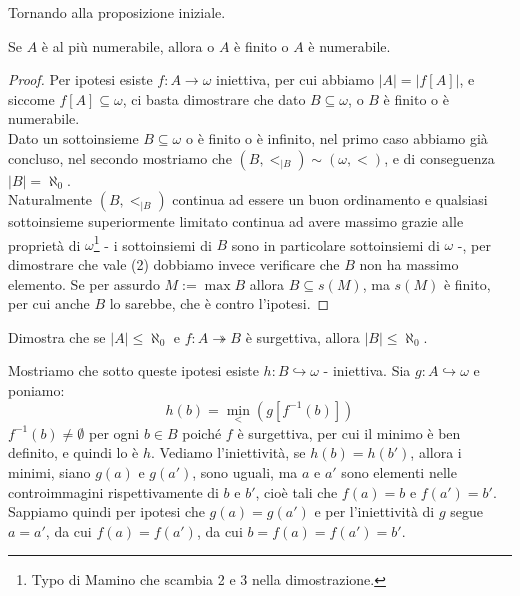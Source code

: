 Tornando alla proposizione iniziale.

\begin{proposition}
	Se $A$ è al più numerabile, allora o $A$ è finito o $A$ è numerabile.
\end{proposition}

\begin{proof}
	Per ipotesi esiste $f : A \rightarrow \omega$ iniettiva, per cui abbiamo $|A| = |f[A]|$, e siccome $f[A] \subseteq \omega$,
	ci basta dimostrare che dato $B \subseteq \omega$, o $B$ è finito o è numerabile.\\
	Dato un sottoinsieme $B \subseteq \omega$ o è finito o è infinito, nel primo caso abbiamo già concluso, nel secondo mostriamo che $(B,<_{|B}) \sim (\omega,<)$, e di conseguenza $|B| = \aleph_0$.\\
	Naturalmente $(B,<_{|B})$ continua ad essere un buon ordinamento e qualsiasi sottoinsieme superiormente limitato continua ad avere massimo grazie alle proprietà di $\omega$\footnote{Typo di Mamino che scambia 2 e 3 nella dimostrazione.} - i sottoinsiemi di $B$ sono in particolare sottoinsiemi di $\omega$ -,
	per dimostrare che vale (2) dobbiamo invece verificare che $B$ non ha massimo elemento. Se per assurdo $M:=\max B$ allora $B \subseteq s(M)$, ma $s(M)$ è finito, per cui anche $B$ lo sarebbe, che è contro l'ipotesi.
\end{proof}

\begin{exercise}
	\label{disuguaglianze_senza_AC2}
	Dimostra che se $|A| \leq \aleph_0$ e $f : A \twoheadrightarrow B$ è surgettiva, allora $|B| \leq \aleph_0$.
\end{exercise}

\begin{soln}
	Mostriamo che sotto queste ipotesi esiste $h : B \hookrightarrow \omega$ - iniettiva. Sia $g : A \hookrightarrow \omega$ e poniamo:
	\[ h(b) = \min_<(g[f^{-1}(b)])
		\]
	$f^{-1}(b) \ne \emptyset$ per ogni $b \in B$ poiché $f$ è surgettiva, per cui il minimo è ben definito, e quindi lo è $h$.
	Vediamo l'iniettività, se $h(b) = h(b')$, allora i minimi, siano $g(a)$ e $g(a')$, sono uguali, ma $a$ e $a'$ sono elementi nelle controimmagini rispettivamente di $b$ e $b'$, cioè tali che $f(a) = b$ e $f(a') = b'$.
	Sappiamo quindi per ipotesi che $g(a) = g(a')$ e per l'iniettività di $g$ segue $a = a'$, da cui $f(a) = f(a')$, da cui $b = f(a) = f(a') = b'$.
\end{soln}

